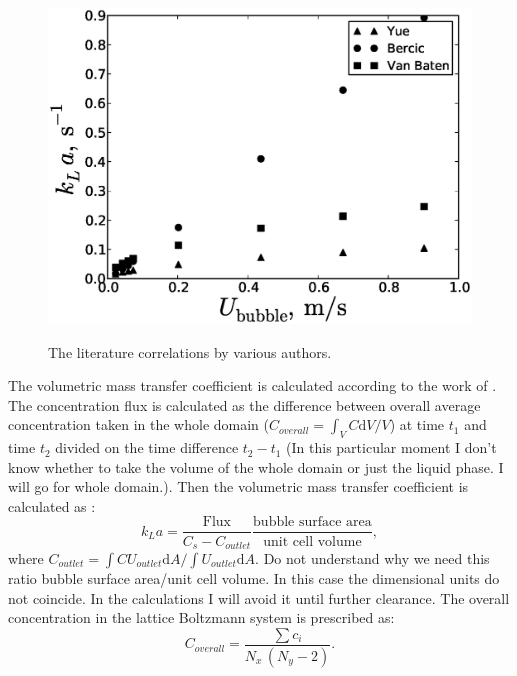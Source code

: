 \documentclass{article}
\begin{document}
\begin{figure}[htb!]
\includegraphics[width=\textwidth]{Figures/theoretical_correlations.eps}\\
\caption{The literature correlations by various authors.\label{fig:mass:transfer:theoretical}}
\end{figure}

The volumetric mass transfer coefficient is calculated according to the work of
\citet{vanbaten-circular}. The concentration flux is calculated as the difference between overall
average concentration taken in the whole domain ($C_{overall}=\int_{V} C \mathrm{d}V /V$)
at time
$t_1$ and time $t_2$ divided on the time difference $t_2-t_1$ {\color{red} (In this particular
moment I don't know whether to take the volume of the whole domain or
just the liquid phase. I will go for whole domain.)}. Then the volumetric mass transfer
coefficient is calculated as \cite{vanbaten-circular}:
\begin{equation}
\label{main:simulation:equation}
k_L a=\frac{\text{Flux}}{C_s-C_{outlet}} \frac{\text{bubble surface area}}{\text{unit cell volume}},
\end{equation}
where $C_{outlet}=\int{C U_{outlet}\mathrm{d}A}/\int{U_{outlet}\mathrm{d}A}$. 
{\color{red} Do not understand why we need this ratio bubble surface area/unit cell volume. In this
case the dimensional units do not coincide. In the calculations I will avoid it until further
clearance.} The overall concentration in the lattice Boltzmann system is prescribed as:
\begin{equation}
C_{overall}=\frac{\sum{c_i}}{N_x \, (N_y-2)}.
\end{equation}
\end{document}
